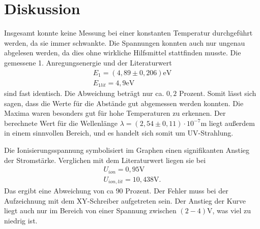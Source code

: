 \section{Diskussion}
\label{sec:Diskussion}

Insgesamt konnte keine Messung bei einer konstanten Temperatur durchgeführt werden, da sie immer schwankte.
Die Spannungen konnten auch nur ungenau abgelesen werden, da dies ohne wirkliche Hilfsmittel stattfinden musste.
Die gemessene 1. Anregungsenergie und der Literaturwert\cite{kent3}
\begin{align*}
E_1 = (4,89 \pm 0,206) \si{\eV} \\
E_{1lit} = 4,9 \si{\eV}
\end{align*}
sind fast identisch. Die Abweichung beträgt nur ca. $0,2$ Prozent.
Somit lässt sich sagen, dass die Werte für die Abstände gut abgemessen werden konnten. 
Die Maxima waren besonders gut für hohe Temperaturen zu erkennen.
Der berechnete Wert für die Wellenlänge $\lambda = (2,54 \pm 0,11)\cdot 10^{-7} \si{\m}$ liegt außerdem in einem sinnvollen Bereich, und es handelt sich
somit um UV-Strahlung.

Die Ionisierungsspannung symbolisiert im Graphen einen signifikanten Anstieg der Stromstärke.
Verglichen mit dem Literaturwert\cite{kent2} liegen sie bei
\begin{align*}
U_{ion} = 0,95\si{\V} \\
U_{ion,lit} = 10,438\si{\V}.
\end{align*}
Das ergibt eine Abweichung von ca $90$ Prozent. Der Fehler muss bei der Aufzeichnung mit dem XY-Schreiber aufgetreten sein. Der Anstieg der Kurve
liegt auch nur im Bereich von einer Spannung zwischen $ (2 - 4) \si{\V}$, was viel zu niedrig ist. 
